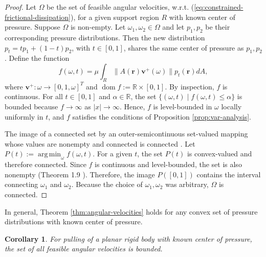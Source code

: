 \documentclass[conference]{IEEEtran}
\newtheorem{corollary}{Corollary}
\DeclareMathOperator*{\argmin}{arg\,min}
\DeclareMathOperator{\dom}{dom}
\begin{document}
\begin{proof}
  Let $\Omega$ be the set of feasible angular velocities,
  w.r.t. (\ref{eq:constrained-frictional-dissipation}), for a given
  support region $R$ with known center of pressure. Suppose $\Omega$
  is non-empty.
  Let $\omega_1, \omega_2 \in \Omega$ and let $p_1, p_2$ be their
  corresponding pressure distributions. Then the new distribution
  $p_t = tp_1 + (1-t)p_2$, with $t \in [0,1]$, shares the same center
  of pressure as $p_1,p_2$. Define the function
  \begin{equation}
    f(\omega, t) = \mu\int_R\lVert A(\mathbf{r})\mathbf{v}^+(\omega)\rVert p_t(\mathbf{r})dA,
  \end{equation}
  where $\mathbf{v}^+: \omega \rightarrow [0,1,\omega]^T$ and
  $\dom f:= \mathbb{R}\times[0,1]$. By inspection, $f$ is
  continuous. For all $t \in [0,1]$ and $\alpha \in \mathbb{R}$, the
  set $\{(\omega,t)\;|\;f(\omega,t)\leq \alpha\}$ is bounded because
  $f \rightarrow \infty$ as $|x|\rightarrow \infty$. Hence, $f$ is
  level-bounded in $\omega$ locally uniformly in $t$, and $f$
  satisfies the conditions of Proposition \ref{prop:var-analysis}.

  The image of a connected set by an outer-semicontinuous set-valued
  mapping whose values are nonempty and connected is connected
  \cite{hiriart1985images}. Let $P(t) := \argmin_\omega f(\omega,t)$.
  For a given $t$, the set $P(t)$ is convex-valued and therefore
  connected. Since $f$ is continuous and level-bounded, the set is
  also nonempty (Theorem 1.9 \cite{Rockafellar}). Therefore, the image
  $P([0,1])$ contains the interval connecting $\omega_1$ and
  $\omega_2$. Because the choice of $\omega_1,\omega_2$ was arbitrary,
  $\Omega$ is connected.
\end{proof}

In general, Theorem \ref{thm:angular-velocities} holds for any convex
set of pressure distributions with known center of pressure. 


\begin{corollary}\label{cor:bounded}
  For pulling of a planar rigid body with known center of pressure,
  the set of all feasible angular velocities is bounded.
\end{corollary}
\end{document}
